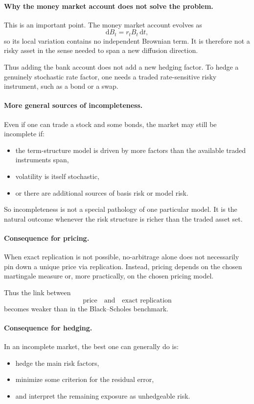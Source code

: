 \documentclass[11pt]{article}
\theoremstyle{plain}
\theoremstyle{definition}
\theoremstyle{remark}
\begin{document}
\paragraph{Why the money market account does not solve the problem.}
This is an important point.
The money market account evolves as
\[
\mathrm{d}B_t=r_tB_t\,\mathrm{d}t,
\]
so its local variation contains no independent Brownian term.
It is therefore not a risky asset in the sense needed to span a new
diffusion direction.

Thus adding the bank account does not add a new hedging factor.
To hedge a genuinely stochastic rate factor, one needs a traded
rate-sensitive risky instrument, such as a bond or a swap.

\paragraph{More general sources of incompleteness.}
Even if one can trade a stock and some bonds, the market may still be
incomplete if:
\begin{itemize}[leftmargin=1.4em]
    \item the term-structure model is driven by more factors than the
    available traded instruments span,
    \item volatility is itself stochastic,
    \item or there are additional sources of basis risk or model risk.
\end{itemize}

So incompleteness is not a special pathology of one particular model.
It is the natural outcome whenever the risk structure is richer than the
traded asset set.

\paragraph{Consequence for pricing.}
When exact replication is not possible, no-arbitrage alone does not
necessarily pin down a unique price via replication.
Instead, pricing depends on the chosen martingale measure or, more
practically, on the chosen pricing model.

Thus the link between
\[
\text{price} \quad \text{and} \quad \text{exact replication}
\]
becomes weaker than in the Black--Scholes benchmark.

\paragraph{Consequence for hedging.}
In an incomplete market, the best one can generally do is:
\begin{itemize}[leftmargin=1.4em]
    \item hedge the main risk factors,
    \item minimize some criterion for the residual error,
    \item and interpret the remaining exposure as unhedgeable risk.
\end{itemize}
\end{document}
